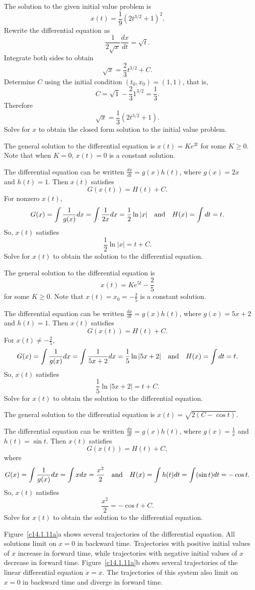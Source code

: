\documentclass{ximera}
\begin{document}
 \ans The solution to the given initial value problem is
\[
x(t) = \frac{1}{9}(2t^{3/2} + 1)^2.
\]
\soln Rewrite the differential equation as 
\[
\frac{1}{2\sqrt{x}}\frac{dx}{dt} = \sqrt{t}.
\]
Integrate both sides to obtain
\[
\sqrt{x} = \frac{2}{3}t^{3/2} + C.
\]
Determine $C$ using the initial condition $(t_0,x_0)=(1,1)$, that is,
\[
C = \sqrt{1} - \frac{2}{3}1^{3/2} = \frac{1}{3}.
\]
Therefore
\[
\sqrt{x} = \frac{1}{3}(2t^{3/2} + 1).
\]
Solve for $x$ to obtain the closed form solution to the initial value problem.

 \ans The general solution to the differential equation is
$x(t) = Ke^{2t}$ for some $K \geq 0$.  Note that when $K = 0$, $x(t) = 0$ is
a constant solution.


\soln The differential equation can be written $\frac{dx}{dt} = g(x)h(t)$,
where $g(x) = 2x$ and $h(t) = 1$.  Then $x(t)$ satisfies
\[
G(x(t)) = H(t) + C.
\]
For nonzero $x(t)$,
\[
G(x) = \int\frac{1}{g(x)}dx = \int\frac{1}{2x}dx = \frac{1}{2}\ln|x|
\quad\mbox{and}\quad
H(x) = \int dt = t.
\]
So, $x(t)$ satisfies
\[
\frac{1}{2}\ln|x| = t + C.
\]
Solve for $x(t)$ to obtain the solution to the differential equation.


 \ans The general solution to the differential equation is 
\[
x(t) = Ke^{5t} - \frac{2}{5}
\]
for some $K \geq 0$.  Note that $x(t) = x_0 = -\frac{2}{5}$ is a constant
solution.

\soln The differential equation can be written $\frac{dx}{dt} = g(x)h(t)$,
where $g(x) = 5x + 2$ and $h(t) = 1$.  Then $x(t)$ satisfies
\[
G(x(t)) = H(t) + C.
\]
For $x(t) \neq -\frac{2}{5}$,
\[
G(x) = \int\frac{1}{g(x)}dx = \int\frac{1}{5x + 2}dx = \frac{1}{5}\ln|5x + 2|
\quad\mbox{and}\quad
H(x) = \int dt = t.
\]
So, $x(t)$ satisfies
\[
\frac{1}{5}\ln|5x + 2| = t + C.
\]
Solve for $x(t)$ to obtain the solution to the differential equation.


 \ans The general solution to the differential equation is
$x(t) = \sqrt{2(C - \cos t)}$.

\soln The differential equation can be written $\frac{dx}{dt} = g(x)h(t)$,
where $g(x) = \frac{1}{x}$ and $h(t) = \sin t$.  Then $x(t)$ satisfies
\[
G(x(t)) = H(t) + C,
\]
where
\[
G(x) = \int\frac{1}{g(x)}dx = \int xdx = \frac{x^2}{2}
\quad\mbox{and}\quad
H(x) = \int h(t)dt = \int(\sin t)dt = -\cos t.
\]
So, $x(t)$ satisfies
\[
\frac{x^2}{2} = -\cos t + C.
\]
Solve for $x(t)$ to obtain the solution to the differential equation.

 Figure~\ref{c14.1.11a}a shows several trajectories of the
differential equation.  All solutions limit on $x = 0$ in backward
time.  Trajectories with positive initial values of $x$ increase in
forward time, while trajectories with negative initial values of $x$
decrease in forward time.  Figure~\ref{c14.1.11a}b shows several trajectories
of the linear differential equation $\dot{x} = x$.  The trajectories of this
system also limit on $x = 0$ in backward time and diverge in forward time.
\end{document}
